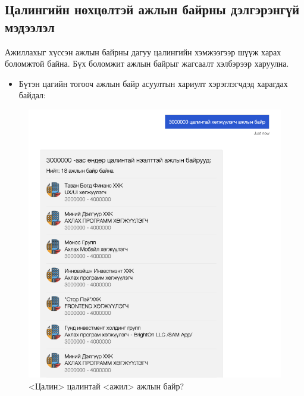 \subsection{Цалингийн нөхцөлтэй ажлын байрны дэлгэрэнгүй мэдээлэл}
Ажиллахыг хүссэн ажлын байрны дагуу цалингийн хэмжээгээр шүүж харах боломжтой байна. Бүх боломжит ажлын байрыг жагсаалт хэлбэрээр харуулна.
\begin{itemize}
  \item Бүтэн цагийн тогооч ажлын байр асуултын хариулт хэрэглэгчдэд харагдах байдал:
\end{itemize}
\begin{figure}[ht]
  \centering
  \includegraphics[width=\textwidth-4cm]{images/question4.png}
  \caption{<Цалин> цалинтай <ажил> ажлын байр?}\label{fig:quest4}
\end{figure}